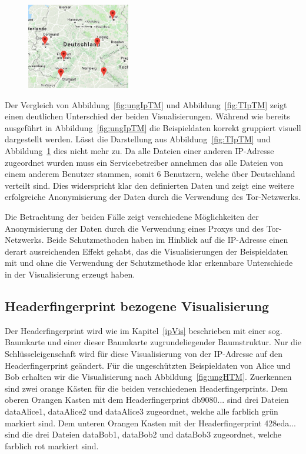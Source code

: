 \documentclass[
    fontsize=12pt,
    headings=small,
    parskip=half,           %
    bibliography=totoc,
    numbers=noenddot,       %
    open=any,               %
    ]{scrreprt}
\begin{document}
\begin{figure}[H]
\includegraphics[width=0.4\textwidth]{../pic/IP-Tor-SetB.PNG}
\label{fig:TIpM}
\end{figure}

Der Vergleich von Abbildung~\ref{fig:ungIpTM} und Abbildung~\ref{fig:TIpTM} zeigt einen deutlichen Unterschied der beiden Visualisierungen.
Während wie bereits ausgeführt in Abbildung~\ref{fig:ungIpTM} die Beispieldaten korrekt gruppiert visuell dargestellt werden. 
Lässt die Darstellung aus Abbildung~\ref{fig:TIpTM} und Abbildung~\ref{fig:TIpM} dies nicht mehr zu.
Da alle Dateien einer anderen IP-Adresse zugeordnet wurden muss ein Servicebetreiber annehmen das alle Dateien von einem anderem Benutzer stammen, somit 6 Benutzern, welche über Deutschland verteilt sind. 
Dies widerspricht klar den definierten Daten und zeigt eine weitere erfolgreiche Anonymisierung der Daten durch die Verwendung des Tor-Netzwerks.

Die Betrachtung der beiden Fälle zeigt verschiedene Möglichkeiten der Anonymisierung der Daten durch die Verwendung eines Proxys und des Tor-Netzwerks.
Beide Schutzmethoden haben im Hinblick auf die IP-Adresse einen derart ausreichenden Effekt gehabt, das die Visualisierungen der Beispieldaten mit und ohne die Verwendung der Schutzmethode klar erkennbare Unterschiede in der Visualisierung erzeugt haben.

    \subsection{Headerfingerprint bezogene Visualisierung}
Der Headerfingerprint wird wie im Kapitel~\ref{ipVis} beschrieben mit einer sog. Baumkarte und einer dieser Baumkarte zugrundeliegender Baumstruktur.
Nur die Schlüsseleigenschaft wird für diese Visualisierung von der IP-Adresse auf den Headerfingerprint geändert.
Für die ungeschützten Beispieldaten von Alice und Bob erhalten wir die Visualisierung nach Abbildung~\ref{fig:ungHTM}.
Zuerkennen sind zwei orange Kästen für die beiden verschiedenen Headerfingerprints.
Dem oberen Orangen Kasten mit dem Headerfingerprint db9080... sind drei Dateien dataAlice1, dataAlice2 und dataAlice3 zugeordnet, welche alle farblich grün markiert sind.
Dem unteren Orangen Kasten mit der Headerfingerprint 428eda... sind die drei Dateien dataBob1, dataBob2 und dataBob3 zugeordnet, welche farblich rot markiert sind.
\end{document}
